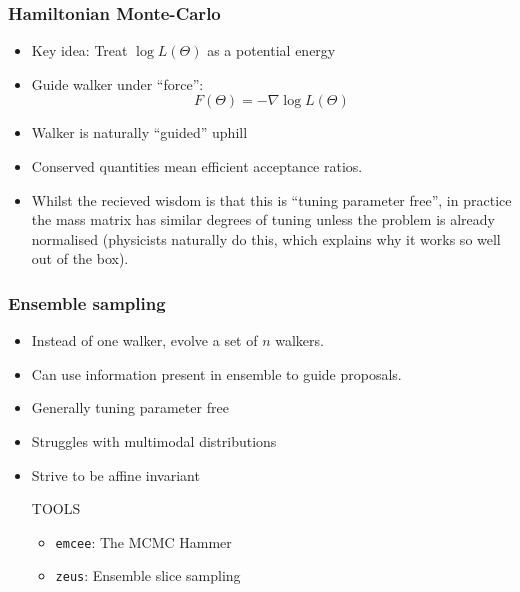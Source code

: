 \documentclass[aspectratio=169]{beamer}
\begin{document}
\begin{frame}
    \frametitle{Hamiltonian Monte-Carlo} 
    \begin{itemize}
        \item Key idea: Treat $\log L(\Theta)$ as a potential energy
        \item Guide walker under ``force'': \[F(\Theta) =-\nabla \log L(\Theta)\]
        \item Walker is naturally ``guided'' uphill
        \item Conserved quantities mean efficient acceptance ratios.
        \item Whilst the recieved wisdom is that this is ``tuning parameter free'', in practice the mass matrix has similar degrees of tuning unless the problem is already normalised (physicists naturally do this, which explains why it works so well out of the box).
    \end{itemize}
\end{frame}

\begin{frame}
    \frametitle{Ensemble sampling} 
    \begin{itemize}
        \item Instead of one walker, evolve a set of $n$ walkers.
        \item Can use information present in ensemble to guide proposals.
        \item Generally tuning parameter free
        \item Struggles with multimodal distributions
        \item Strive to be affine invariant
    \begin{block}{TOOLS}
        \begin{itemize}
            \item \texttt{emcee}: The MCMC Hammer~
            \item \texttt{zeus}: Ensemble slice sampling~
        \end{itemize}
    \end{block}
    \end{itemize}
\end{frame}
\end{document}

